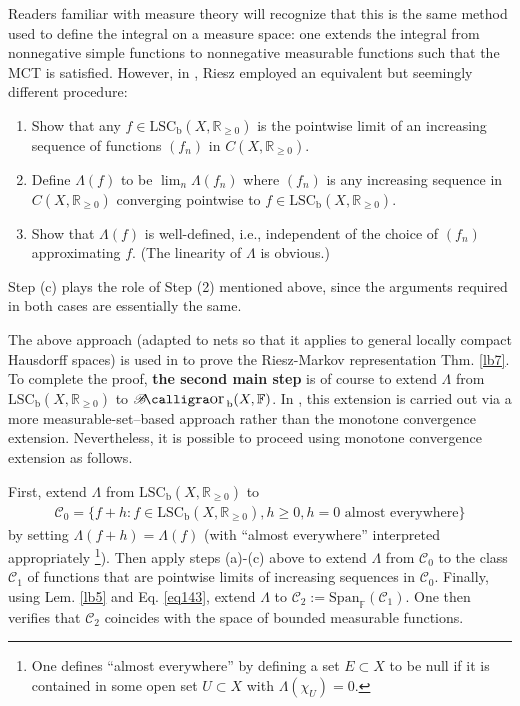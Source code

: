 \documentclass[12pt,b5paper,notitlepage]{article}
\theoremstyle{definition}
\theoremstyle{plain}
\DeclareMathOperator{\Borb}{{\mathscr{B}\text{\kern -2pt {\calligra\large or}}\,}_{\mathrm b}}
\newcommand{\Span}{\mathrm{Span}}
\newcommand{\scr}{\mathscr}
\newcommand{\Rbb}{\mathbb R}
\newcommand{\Fbb}{\mathbb F}
\newcommand{\LSCb}{\mathrm{LSC}_{\mathrm b}}
\numberwithin{equation}{section}
\begin{document}
Readers familiar with measure theory will recognize that this is the same method used to define the integral on a measure space: one extends the integral from nonnegative simple functions to nonnegative measurable functions such that the MCT is satisfied. However, in \cite{Rie13,Rie14}, Riesz employed an equivalent but seemingly different procedure:
\begin{enumerate}[label=(\alph*)]
\item Show that any $f\in\LSCb(X,\Rbb_{\geq0})$ is the pointwise limit of an increasing sequence of functions $(f_n)$ in $C(X,\Rbb_{\geq0})$.
\item Define $\Lambda(f)$ to be $\lim_n\Lambda(f_n)$ where $(f_n)$ is any increasing sequence in $C(X,\Rbb_{\geq0})$ converging pointwise to $f\in\LSCb(X,\Rbb_{\geq0})$.
\item Show that $\Lambda(f)$ is well-defined, i.e., independent of the choice of $(f_n)$ approximating $f$. (The linearity of $\Lambda$ is obvious.)
\end{enumerate}
Step (c) plays the role of Step (2) mentioned above, since the arguments required in both cases are essentially the same.



The above approach (adapted to nets so that it applies to general locally compact Hausdorff spaces) is used in \cite[Ch. 25]{Gui-A} to prove the Riesz-Markov representation Thm. \ref{lb7}. To complete the proof, \textbf{the second main step} is of course to extend $\Lambda$ from $\LSCb(X,\Rbb_{\geq0})$ to $\Borb(X,\Fbb)$. In \cite{Gui-A}, this extension is carried out via a more measurable-set--based approach rather than the monotone convergence extension. Nevertheless, it is possible to proceed using monotone convergence extension as follows. 

First, extend $\Lambda$ from $\LSCb(X,\Rbb_{\geq0})$ to
\begin{align*}
\scr C_0=\{f+h:f\in\LSCb(X,\Rbb_{\geq0}),h\geq0,h=0\text{ almost everywhere}\}
\end{align*}
by setting $\Lambda(f+h)=\Lambda(f)$ (with ``almost everywhere'' interpreted appropriately \footnote{One defines ``almost everywhere'' by defining a set $E\subset X$ to be null if it is contained in some open set $U\subset X$ with $\Lambda(\chi_U)=0$.}). Then apply steps (a)-(c) above to extend $\Lambda$ from $\scr C_0$ to the class $\scr C_1$ of functions that are pointwise limits of increasing sequences in $\scr C_0$. Finally, using Lem. \ref{lb5} and Eq. \eqref{eq143}, extend $\Lambda$ to $\scr C_2:=\Span_\Fbb(\scr C_1)$. One then verifies that $\scr C_2$ coincides with the space of bounded measurable functions. 
\end{document}

